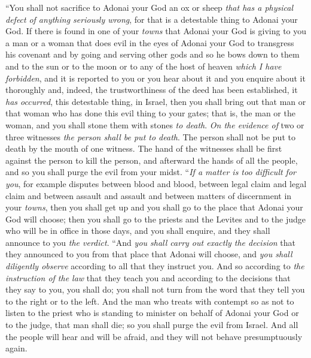 \begin{biblechapter} %
\verse “You shall not sacrifice to Adonai your God an ox or sheep \textit{that has a physical defect} \textit{of anything seriously wrong}, for that is a detestable thing to Adonai your God.
\verse If there is found in one of your \textit{towns} that Adonai your God is giving to you a man or a woman that does evil in the eyes of Adonai your God to transgress his covenant
\verse and by going and serving other gods and so he bows down to them and to the sun or to the moon or to any of the host of heaven \textit{which I have forbidden},
\verse and it is reported to you or you hear about it and you enquire about it thoroughly and, indeed, the trustworthiness of the deed has been established, it \textit{has occurred}, this detestable thing, in Israel,
\verse then you shall bring out that man or that woman who has done this evil thing to your gates; that is, the man or the woman, and you shall stone them with stones \textit{to death}.
\verse \textit{On the evidence of} two or three witnesses \textit{the person shall be put to death}. The person shall not be put to death by the mouth of one witness.
\verse The hand of the witnesses shall be first against the person to kill the person, and afterward the hands of all the people, and so you shall purge the evil from your midst.
\verse “\textit{If a matter is too difficult for you}, for example disputes between blood and blood, between legal claim and legal claim and between assault and assault and between matters of discernment in your \textit{towns}, then you shall get up and you shall go to the place that Adonai your God will choose;
\verse then you shall go to the priests and the Levites and to the judge who will be in office in those days, and you shall enquire, and they shall announce to you \textit{the verdict}.
\verse “And \textit{you shall carry out exactly the decision} that they announced to you from that place that Adonai will choose, and \textit{you shall diligently observe} according to all that they instruct you.
\verse And so according to \textit{the instruction of the law} that they teach you and according to the decisions that they say to you, you shall do; you shall not turn from the word that they tell you to the right or to the left.
\verse And the man who treats with contempt so as not to listen to the priest who is standing to minister on behalf of Adonai your God or to the judge, that man shall die; so you shall purge the evil from Israel.
\verse And all the people will hear and will be afraid, and they will not behave presumptuously again.

\end{biblechapter}
